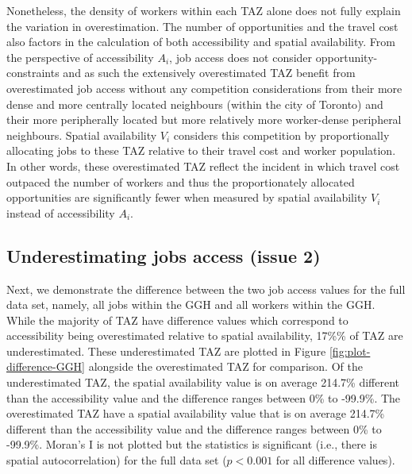 \documentclass[]{elsarticle} %
\begin{document}
Nonetheless, the density of workers within each TAZ alone does not fully
explain the variation in overestimation. The number of opportunities and
the travel cost also factors in the calculation of both accessibility
and spatial availability. From the perspective of accessibility \(A_i\),
job access does not consider opportunity-constraints and as such the
extensively overestimated TAZ benefit from overestimated job access
without any competition considerations from their more dense and more
centrally located neighbours (within the city of Toronto) and their more
peripherally located but more relatively more worker-dense peripheral
neighbours. Spatial availability \(V_i\) considers this competition by
proportionally allocating jobs to these TAZ relative to their travel
cost and worker population. In other words, these overestimated TAZ
reflect the incident in which travel cost outpaced the number of workers
and thus the proportionately allocated opportunities are significantly
fewer when measured by spatial availability \(V_i\) instead of
accessibility \(A_i\).

\hypertarget{underestimating-jobs-access-issue-2}{%
\subsection{Underestimating jobs access (issue
2)}\label{underestimating-jobs-access-issue-2}}

Next, we demonstrate the difference between the two job access values
for the full data set, namely, all jobs within the GGH and all workers
within the GGH. While the majority of TAZ have difference values which
correspond to accessibility being overestimated relative to spatial
availability, 17\%\% of TAZ are underestimated. These underestimated TAZ
are plotted in Figure \ref{fig:plot-difference-GGH} alongside the
overestimated TAZ for comparison. Of the underestimated TAZ, the spatial
availability value is on average 214.7\% different than the
accessibility value and the difference ranges between 0\% to -99.9\%.
The overestimated TAZ have a spatial availability value that is on
average 214.7\% different than the accessibility value and the
difference ranges between 0\% to -99.9\%. Moran's I is not plotted but
the statistics is significant (i.e., there is spatial autocorrelation)
for the full data set (\(p< 0.001\) for all difference values).
\end{document}

